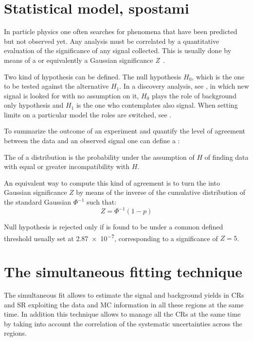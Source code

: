 \section{Statistical model, spostami}
In particle physics one often searches for phenomena that have been predicted but not observed yet. Any analysis must be correlated by a quantitative evaluation of the significance of any signal collected. This is usually done by means of a \p or equivalently a Gaussian significance \emph{Z}~\cite{Cowan}.

Two kind of hypothesis can be defined. The null hypothesis $H_{0}$, which is the one to be tested against the alternative $H_{1}$. In a discovery analysis, see , in which new signal is looked for with no assumption on it, $H_{0}$ plays the role of background only hypothesis and $H_{1}$ is the one who contemplates also signal. When setting limits on a particular model the roles are switched, see .

To summarize the outcome of an experiment and quantify the level of agreement between the data and an observed signal one can define a \p:
\begin{definizione}
  The \p of a distribution is the probability under the assumption of $H$ of finding data with equal or greater incompatibility with $H$.
\end{definizione}

An equivalent way to compute this kind of agreement is to turn the \p into Gaussian significance $Z$ by means of the inverse of the cumulative distribution of the standard Gaussian $\Phi^{-1}$ such that:
\begin{equation}
  Z = \Phi^{-1}(1-p)
\end{equation}

Null hypothesis is rejected only if \p is found to be under a common defined threshold usually set at \num{2.87e-7}, corresponding to a significance of $Z=5$.

\section{The simultaneous fitting technique}
\label{sec:simfit}
The simultaneous fit allows to estimate the signal and background yields in CRs and SR exploiting the data and MC information in all these regions at the same time. In addition this technique allows to manage all the CRs at the same time by taking into account the correlation of the systematic uncertainties across the regions.

